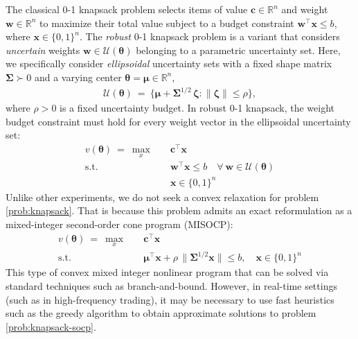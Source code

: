 \documentclass[10pt]{article} %
\theoremstyle{plain}
\theoremstyle{definition}
\theoremstyle{remark}
\begin{document}
The classical 0-1 knapsack problem selects items of value $\mathbf{c} \in \mathbb{R}^n$ and weight $\mathbf{w} \in \mathbb{R}^n$ to maximize their total value subject to a budget constraint $\mathbf{w}^\top \mathbf{x} \leq b$, where $\mathbf{x} \in \{0, 1\}^n$.
The \textit{robust} 0-1 knapsack problem is a variant that considers \textit{uncertain} weights $\mathbf{w} \in \mathcal{U}(\bm{\theta})$ belonging to a parametric uncertainty set.
Here, we specifically consider \textit{ellipsoidal} uncertainty sets with a fixed shape matrix $\bm{\Sigma} \succ 0$ and a varying center $\bm{\theta} = \bm{\mu} \in \mathbb{R}^{n}$,
\begin{align*}
    \mathcal{U}(\bm{\theta}) ~=~ \{ \bm{\mu} + \bm{\Sigma}^{1/2} \, \bm{\zeta} : \| \bm{\zeta} \| \leq \rho \},
\end{align*}
where $\rho > 0$ is a fixed uncertainty budget. In robust 0-1 knapsack, the weight budget constraint must hold for every weight vector in the ellipsoidal uncertainty set:
\begin{equation}
\begin{aligned}
    v(\bm{\theta}) ~=~ \max_{x} \quad & \mathbf{c}^\top \mathbf{x} \\
    \text{s.t.} \quad & \mathbf{w}^\top \mathbf{x} \leq b \quad \forall ~ \mathbf{w} \in \mathcal{U}(\bm{\theta}) \\
    & \mathbf{x} \in \{0, 1\}^n
\end{aligned}
\label{prob:knapsack}
\end{equation}
Unlike other experiments, we do not seek a convex relaxation for problem \cref{prob:knapsack}{}{}. That is because this problem admits an exact reformulation as a mixed-integer second-order cone program (MISOCP):
\begin{equation}
\begin{aligned}
    v(\bm{\theta}) ~=~ \max_{x} \quad & \mathbf{c}^\top \mathbf{x} \\
    \text{s.t.} \quad & \bm{\mu}^\top \mathbf{x} + \rho\,\|\bm{\Sigma}^{1/2}\mathbf{x}\| \leq b, \quad \mathbf{x} \in \{0,1\}^n
\end{aligned}
\label{prob:knapsack-socp}
\end{equation}
This type of convex mixed integer nonlinear program that can be solved via standard techniques such as branch-and-bound. However, in real-time settings (such as in high-frequency trading), it may be necessary to use fast heuristics such as the greedy algorithm to obtain approximate solutions to problem \cref{prob:knapsack-socp}{}{}.
\end{document}
